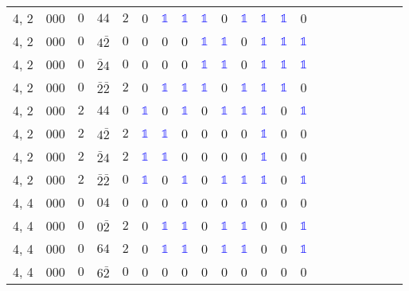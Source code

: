 \begin{longtable*}{c| cccccccccccccccccccc }
4, 2& 000& $0$& $44$& $2$& 0& \textcolor{blue}{$\mathds{1}$}& \textcolor{blue}{$\mathds{1}$}& \textcolor{blue}{$\mathds{1}$}& 0& \textcolor{blue}{$\mathds{1}$}& \textcolor{blue}{$\mathds{1}$}& \textcolor{blue}{$\mathds{1}$}& 0\\
4, 2& 000& $0$& $4\bar{2}$& $0$& 0& 0& 0& \textcolor{blue}{$\mathds{1}$}& \textcolor{blue}{$\mathds{1}$}& 0& \textcolor{blue}{$\mathds{1}$}& \textcolor{blue}{$\mathds{1}$}& \textcolor{blue}{$\mathds{1}$}\\
4, 2& 000& $0$& $\bar{2}4$& $0$& 0& 0& 0& \textcolor{blue}{$\mathds{1}$}& \textcolor{blue}{$\mathds{1}$}& 0& \textcolor{blue}{$\mathds{1}$}& \textcolor{blue}{$\mathds{1}$}& \textcolor{blue}{$\mathds{1}$}\\
4, 2& 000& $0$& $\bar{2}\bar{2}$& $2$& 0& \textcolor{blue}{$\mathds{1}$}& \textcolor{blue}{$\mathds{1}$}& \textcolor{blue}{$\mathds{1}$}& 0& \textcolor{blue}{$\mathds{1}$}& \textcolor{blue}{$\mathds{1}$}& \textcolor{blue}{$\mathds{1}$}& 0\\
4, 2& 000& $2$& $44$& $0$& \textcolor{blue}{$\mathds{1}$}& 0& \textcolor{blue}{$\mathds{1}$}& 0& \textcolor{blue}{$\mathds{1}$}& \textcolor{blue}{$\mathds{1}$}& \textcolor{blue}{$\mathds{1}$}& 0& \textcolor{blue}{$\mathds{1}$}\\
4, 2& 000& $2$& $4\bar{2}$& $2$& \textcolor{blue}{$\mathds{1}$}& \textcolor{blue}{$\mathds{1}$}& 0& 0& 0& 0& \textcolor{blue}{$\mathds{1}$}& 0& 0\\
4, 2& 000& $2$& $\bar{2}4$& $2$& \textcolor{blue}{$\mathds{1}$}& \textcolor{blue}{$\mathds{1}$}& 0& 0& 0& 0& \textcolor{blue}{$\mathds{1}$}& 0& 0\\
4, 2& 000& $2$& $\bar{2}\bar{2}$& $0$& \textcolor{blue}{$\mathds{1}$}& 0& \textcolor{blue}{$\mathds{1}$}& 0& \textcolor{blue}{$\mathds{1}$}& \textcolor{blue}{$\mathds{1}$}& \textcolor{blue}{$\mathds{1}$}& 0& \textcolor{blue}{$\mathds{1}$}\\
4, 4& 000& $0$& $04$& $0$& 0& 0& 0& 0& 0& 0& 0& 0& 0\\
4, 4& 000& $0$& $0\bar{2}$& $2$& 0& \textcolor{blue}{$\mathds{1}$}& \textcolor{blue}{$\mathds{1}$}& 0& \textcolor{blue}{$\mathds{1}$}& \textcolor{blue}{$\mathds{1}$}& 0& 0& \textcolor{blue}{$\mathds{1}$}\\
4, 4& 000& $0$& $64$& $2$& 0& \textcolor{blue}{$\mathds{1}$}& \textcolor{blue}{$\mathds{1}$}& 0& \textcolor{blue}{$\mathds{1}$}& \textcolor{blue}{$\mathds{1}$}& 0& 0& \textcolor{blue}{$\mathds{1}$}\\
4, 4& 000& $0$& $6\bar{2}$& $0$& 0& 0& 0& 0& 0& 0& 0& 0& 0\\

\end{longtable*}

